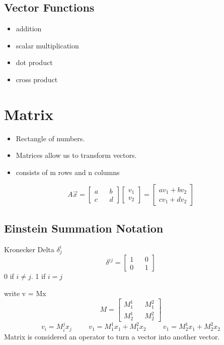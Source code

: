 \documentclass{report}
\begin{document}
\subsection*{Vector Functions}
\begin{itemize}
\item
addition
\item
scalar multiplication
\item
dot product
\item
cross product

\end{itemize}



\section{Matrix}
\begin{itemize}
\item
Rectangle of numbers. 
\item
Matrices allow us to transform vectors.
\item
consists of m rows and n columns
\end{itemize}
\[
A\vec{x} =
\begin{bmatrix}
a && b \\
c && d 
\end{bmatrix}
\begin{bmatrix}
v_1 \\ v_2
\end{bmatrix}
=
\begin{bmatrix}
av_1 + bv_2 \\
cv_1 + dv_2
\end{bmatrix}
\]

\subsection{Einstein Summation Notation}
Kronecker Delta $\delta^i_j$
\[
\delta^{ij}= 
\begin{bmatrix}
1 && 0 \\ 0 && 1 
\end{bmatrix}
\]
0 if $i \neq j$.
1 if $i = j$

write v = Mx
\[
M = \begin{bmatrix}
M^1_1 && M^2_1 \\
M^1_2 && M^2_2 
\end{bmatrix}
\]
\[
v_i = M^j_i x_j 
\hspace{1cm}
v_1 = M^1_1x_1 + M^2_1x_2
\hspace{1cm}
v_1 = M^1_2x_1 + M^2_2x_2
\]
Matrix is considered an operator to turn a vector into another vector.
\end{document}
